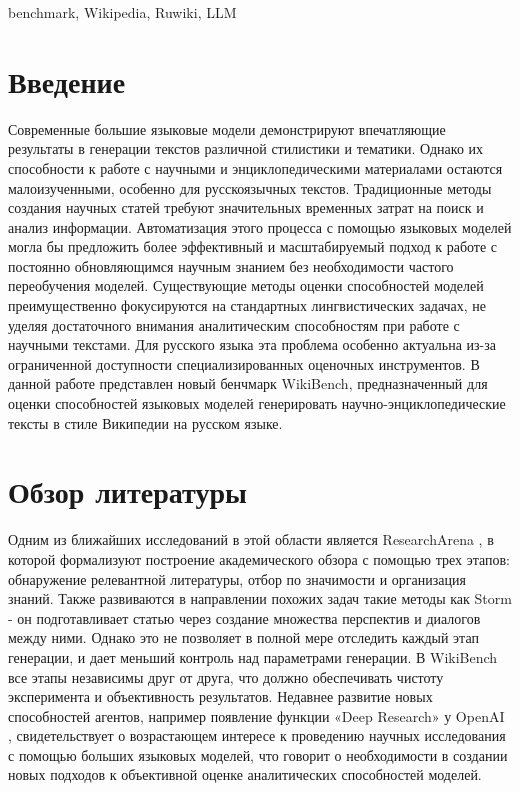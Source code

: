 \documentclass{article}
\theoremstyle{definition}
\theoremstyle{plain}
\begin{document}
\begin{altkeywords}
benchmark, Wikipedia, Ruwiki, LLM
\end{altkeywords}


\section*{Введение}

Современные большие языковые модели демонстрируют впечатляющие результаты в генерации текстов различной стилистики и тематики. 
Однако их способности к работе с научными и энциклопедическими материалами остаются малоизученными, особенно для русскоязычных текстов. 
Традиционные методы создания научных статей требуют значительных временных затрат на поиск и анализ информации. 
Автоматизация этого процесса с помощью языковых моделей могла бы предложить более эффективный и масштабируемый подход к работе с постоянно обновляющимся научным знанием без необходимости частого переобучения моделей.
Существующие методы оценки способностей моделей преимущественно фокусируются на стандартных лингвистических задачах, не уделяя достаточного внимания аналитическим способностям при работе с научными текстами.
Для русского языка эта проблема особенно актуальна из-за ограниченной доступности специализированных оценочных инструментов.
В данной работе представлен новый бенчмарк WikiBench, предназначенный для оценки способностей языковых моделей генерировать научно-энциклопедические тексты в стиле Википедии на русском языке. 

\section*{Обзор литературы}
Одним из ближайших исследований в этой области является ResearchArena \cite{resar}, в которой формализуют построение академического обзора с помощью трех этапов:
обнаружение релевантной литературы, отбор по значимости и организация знаний.
Также развиваются в направлении похожих задач такие методы как Storm \cite{storm} - он подготавливает статью через создание множества перспектив и диалогов между ними.
Однако это не позволяет в полной мере отследить каждый этап генерации, и дает меньший контроль над параметрами генерации. В WikiBench все этапы независимы друг от друга, 
что должно обеспечивать чистоту эксперимента и объективность результатов.
Недавнее развитие новых способностей агентов, например появление функции «Deep Research» у OpenAI \cite{deepr}, 
свидетельствует о возрастающем интересе к проведению научных исследования с помощью больших языковых моделей, 
что говорит о необходимости в создании новых подходов к объективной оценке аналитических способностей моделей. 
\end{document}
